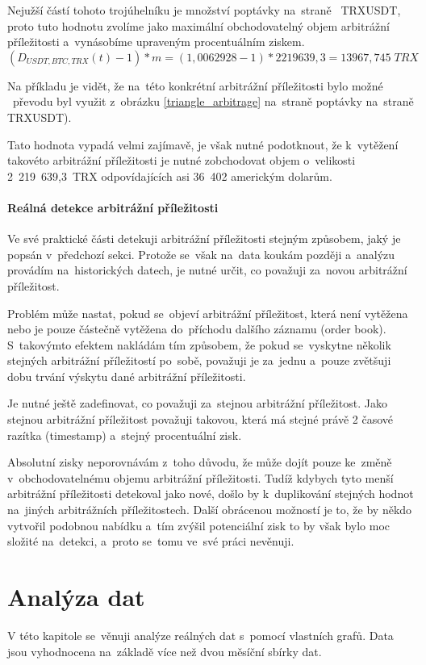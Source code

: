 \documentclass[thesis=B,czech]{FITthesis}[2019/03/21]
\begin{document}
Nejužší částí tohoto trojúhelníku je množství poptávky na~straně \linebreak~TRXUSDT, proto tuto hodnotu zvolíme jako maximální obchodovatelný objem arbitrážní příležitosti a~vynásobíme upraveným procentuálním ziskem. 
\[(D_{USDT,BTC,TRX}(t) - 1) * m = (1,0062928 - 1) * 2219639,3 = 13967,745\;TRX\]

Na příkladu je vidět, že na~této konkrétní arbitrážní příležitosti bylo možné ~převodu byl využit z~obrázku \ref{triangle_arbitrage} na~straně poptávky na~straně TRXUSDT).

Tato hodnota vypadá velmi zajímavě, je však nutné podotknout, že \linebreak k~vytěžení takovéto arbitrážní příležitosti je nutné zobchodovat objem o~velikosti 2~219~639,3~TRX odpovídajících asi 36~402 americkým dolarům. 

\subsubsection{Reálná detekce arbitrážní příležitosti}
Ve své praktické části detekuji arbitrážní příležitosti stejným způsobem, jaký je popsán v~předchozí sekci. Protože se~však na~data koukám později a~analýzu provádím na~historických datech, je nutné určit, co považuji za~novou arbitrážní příležitost.

Problém může nastat, pokud se~objeví arbitrážní příležitost, která není vytěžena nebo je pouze částečně vytěžena do~příchodu dalšího záznamu (order book). S~takovýmto efektem nakládám tím způsobem, že pokud se~vyskytne několik stejných arbitrážní příležitostí po~sobě, považuji je za~jednu a~pouze zvětšuji dobu trvání výskytu dané arbitrážní příležitosti.

Je nutné ještě zadefinovat, co považuji za~stejnou arbitrážní příležitost. Jako stejnou arbitrážní příležitost považuji takovou, která má stejné právě 2 časové razítka (timestamp) a~stejný procentuální zisk. 

Absolutní zisky neporovnávám z~toho důvodu, že může dojít pouze ke~změně v~obchodovatelnému objemu arbitrážní příležitosti. Tudíž kdybych tyto menší arbitrážní příležitosti detekoval jako nové, došlo by k~duplikování stejných hodnot na~jiných arbitrážních příležitostech. Další obrácenou možností je to, že by někdo vytvořil podobnou nabídku a~tím zvýšil potenciální zisk to by však bylo moc složité na~detekci, a~proto se~tomu ve~své práci nevěnuji. 

\chapter{Analýza dat}
V této kapitole se~věnuji analýze  reálných dat s~pomocí vlastních grafů. Data jsou vyhodnocena na~základě více než dvou měsíční sbírky dat.
\end{document}
